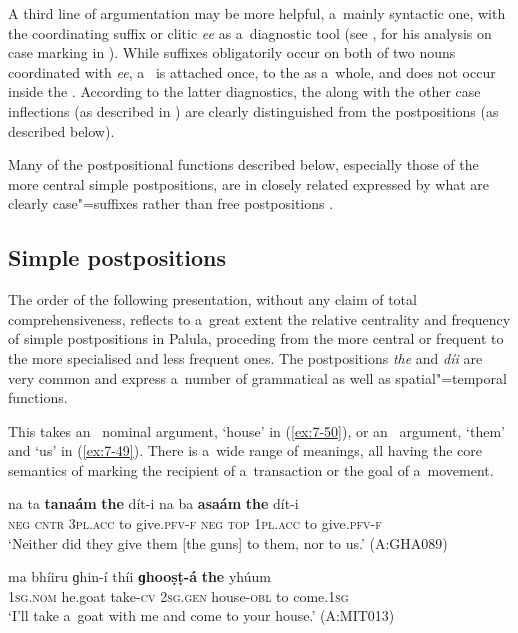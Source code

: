 A third line of argumentation may be more helpful, a~mainly syntactic one, with the coordinating suffix or clitic \textit{ee} as a~diagnostic tool (see \citealt[77]{baart1999a}, for his analysis on case marking in \iliGawri). While  suffixes obligatorily occur on both of two nouns coordinated with \textit{ee}, a~ is attached once, to the  as a~whole, and does not occur inside the . According to the latter diagnostics, the  along with the other case inflections (as described in ) are clearly distinguished from the postpositions (as described below). 

\largerpage[-1]
Many of the postpositional functions described below, especially those of the more central simple postpositions, are in closely related \iliKohistani \iliShina \citep[115--130]{schmidtkohistani2001} expressed by what are clearly  case"=suffixes rather than free postpositions . 


\subsection{Simple postpositions}
\label{subsec:7-2-2}

The order of the following presentation, without any claim of total comprehensiveness, reflects to a~great extent the relative centrality and frequency of simple postpositions in Palula, proceding from the more central or frequent to the more specialised and less frequent ones. The postpositions \textit{the} and \textit{díi} are very common and express a~number of grammatical as well as spatial"=temporal functions. 


 This  takes an~ nominal argument, `house' in (\ref{ex:7-50}), or an~  argument, `them' and `us' in (\ref{ex:7-49}). There is a~wide range of meanings, all having the core semantics of marking the recipient of a~transaction or the goal of a~movement. 
\begin{exe}
\ex
\label{ex:7-49}
\gll na ta \textbf{tanaám} \textbf{the} dít-i na ba  \textbf{asaám} \textbf{the} dít-i \\
\textsc{neg} \textsc{cntr} \textsc{3pl.acc} to give.\textsc{pfv-f} \textsc{neg} \textsc{top} \textsc{1pl.acc} to give.\textsc{pfv-f} \\
\glt `Neither did they give them [the guns] to them, nor to us.' (A:GHA089)
\end{exe}
\begin{exe}
\ex
\label{ex:7-50}
\gll ma bhíiru ɡhin-í thíi \textbf{ɡhooṣṭ-á} \textbf{the} yhúum \\
\textsc{1sg.nom} he.goat take-\textsc{cv} \textsc{2sg.gen} house-\textsc{obl} to come.\textsc{1sg} \\
\glt `I'll take a~goat with me and come to your house.' (A:MIT013)
\end{exe}


